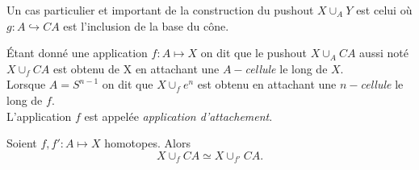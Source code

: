 \documentclass[main.tex]{subfiles}
\begin{document}
	Un cas particulier et important de la construction du pushout $X \cup_A Y$ est celui où $g : A \hookrightarrow CA$ est l'inclusion de la base du cône. 
	\begin{definition}
		Étant donné une application $f : A \longmapsto X$ on dit que le pushout $X \cup_A CA$ aussi noté $X \cup_f CA$ est obtenu de X en attachant une $A-$\textit{cellule} le long de $X$. \\
		Lorsque $A = S^{n-1}$ on dit que $X \cup_f e^n$ est obtenu en attachant une $n-$\textit{cellule} le long de $f$. \\
		L'application $f$ est appelée \textit{application d'attachement}.
	\end{definition}

	\begin{prop}
		Soient $f,f' : A \longmapsto X$ homotopes. Alors \[
			X \cup_f CA \simeq X \cup_{f'} CA
		.\] 
	\end{prop}
\end{document}
